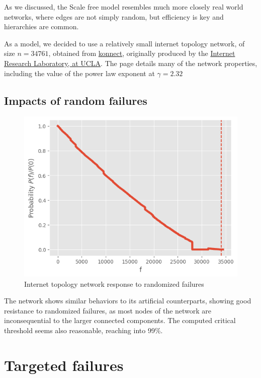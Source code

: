 \documentclass[
]{article}
\begin{document}
As we discussed, the Scale free model resembles much more closely real
world networks, where edges are not simply random, but efficiency is key
and hierarchies are common.

As a model, we decided to use a relatively small internet topology
network, of size \(n = 34761\), obtained from
\href{http://konect.cc/networks/topology/}{konnect}, originally produced
by the \href{http://irl.cs.ucla.edu/}{Internet Research Laboratory, at
UCLA}. The page details many of the network properties, including the
value of the power law exponent at \(\gamma = 2.32\)


\hypertarget{impacts-of-random-failures}{%
\subsection{Impacts of random
failures}\label{impacts-of-random-failures}}


\begin{figure}
  \centering
  \includegraphics{assets/internet_random_fail_2.png}
  \caption{Internet topology network response to randomized failures}
\end{figure}

The network shows similar behaviors to its artificial counterparts,
showing good resistance to randomized failures, as most nodes of the
network are inconsequential to the larger connected components. The
computed critical threshold seems also reasonable, reaching into 99\%.

\hypertarget{targeted-failures}{%
\section{Targeted failures}\label{targeted-failures}}
\end{document}
